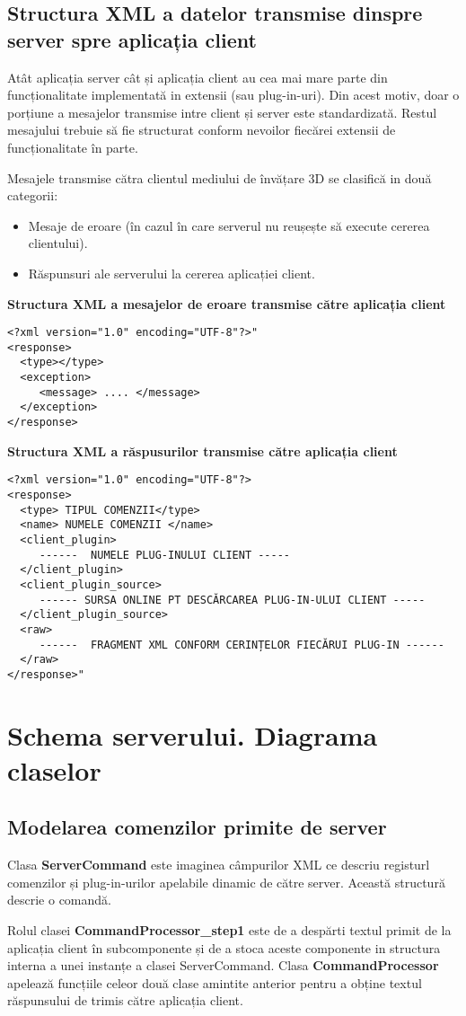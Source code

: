 \subsection{Structura XML a datelor transmise dinspre server spre aplicația client}
\par Atât aplicația server cât și aplicația client au cea mai mare parte din funcționalitate implementată in extensii (sau plug-in-uri). Din acest motiv, doar o porțiune a mesajelor transmise intre client și server este standardizată. Restul mesajului trebuie să fie structurat conform nevoilor fiecărei extensii de funcționalitate în parte.
\par Mesajele transmise cătra clientul mediului de învățare 3D se clasifică in două categorii:
\begin{itemize}
\item Mesaje de eroare (în cazul în care serverul nu reușește să execute cererea clientului).
\item Răspunsuri ale serverului la cererea aplicației client.
\end{itemize}
\textbf{Structura XML a mesajelor de eroare transmise către aplicația client}
\begin{verbatim}
<?xml version="1.0" encoding="UTF-8"?>"
<response>
  <type></type>
  <exception>
     <message> .... </message>
  </exception>
</response>
\end{verbatim}
\textbf{Structura XML a răspusurilor transmise către aplicația client}
\begin{verbatim}
<?xml version="1.0" encoding="UTF-8"?>
<response>
  <type> TIPUL COMENZII</type>
  <name> NUMELE COMENZII </name>  
  <client_plugin> 
     ------  NUMELE PLUG-INULUI CLIENT -----
  </client_plugin>
  <client_plugin_source> 
     ------ SURSA ONLINE PT DESCĂRCAREA PLUG-IN-ULUI CLIENT -----
  </client_plugin_source>
  <raw>
     ------  FRAGMENT XML CONFORM CERINȚELOR FIECĂRUI PLUG-IN ------
  </raw>
</response>"
\end{verbatim}

\section{Schema serverului. Diagrama claselor }
\subsection{Modelarea comenzilor primite de server}
\par Clasa \textbf{ServerCommand} este imaginea câmpurilor XML ce descriu registurl comenzilor și plug-in-urilor apelabile dinamic de către server. Această structură descrie o comandă.
\par Rolul clasei \textbf{CommandProcessor\_step1} este de a despărti textul primit de la aplicația client în subcomponente și de a stoca aceste componente in structura interna a unei instanțe a clasei ServerCommand. Clasa \textbf{CommandProcessor} apelează funcțiile celeor două clase amintite anterior pentru a obține textul răspunsului de trimis către aplicația client.

